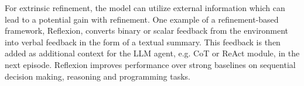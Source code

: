 For extrinsic refinement, the model can utilize external information which can lead to a potential gain with refinement\cite{welleck2024decodingmetagenerationinferencetimealgorithms}.
One example of a refinement-based framework, Reflexion\cite{shinn2023reflexionlanguageagentsverbal}, converts binary or scalar feedback from the environment into verbal feedback in the form 
of a textual summary. This feedback is then added as additional context for the LLM agent, e.g. CoT or ReAct module, in the next episode. 
Reflexion improves performance over strong baselines on sequential decision making, reasoning and programming tasks\cite{shinn2023reflexionlanguageagentsverbal}.



